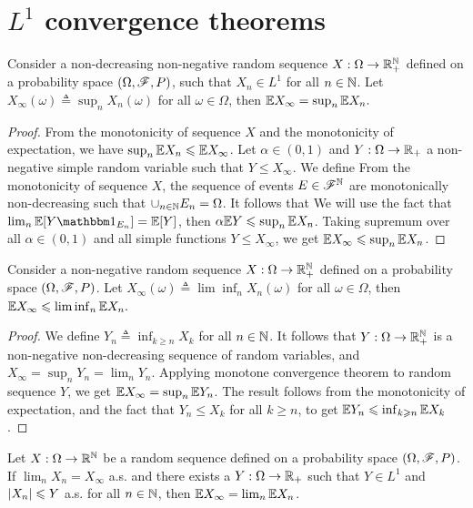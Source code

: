 \documentclass[letterpaper,10pt,english]{article}
\begin{document}
\section{$L^1$ convergence theorems}
\begin{thm}
Consider a non-decreasing non-negative random sequence $X: \Omega\to\mathbb{R}_+^{\mathbb{N}}$ defined on a probability space $(\Omega,\mathscr{F},P)$, 
such that $X_n \in L^1$ for all $n \in \mathbb{N}$. 
Let $X_\infty(\omega) \triangleq \sup_nX_n(\omega)$ for all $\omega \in \Omega$, then  
$
\mathbb{E} X_\infty = \sup_n\mathbb{E} X_n.
$
\end{thm}
\begin{proof}
From the monotonicity of sequence $X$ and the monotonicity of expectation, we have $\sup_n\mathbb{E} X_n \leqslant \mathbb{E} X_\infty$. 
Let $\alpha \in (0,1)$ and $Y: \Omega\to\mathbb{R}_+$ a non-negative simple random variable such that $Y \le X_\infty$. 
We define 
From the monotonicity of sequence $X$, 
the sequence of events $E \in \mathscr{F}^{\mathbb{N}}$ are monotonically non-decreasing such that $\cup_{n \in \mathbb{N}}E_n = \Omega$. 
It follows that 
We will use the fact that $\lim_n\E[Y\Ind{E_n}] = \E[Y]$, then $\alpha\mathbb{E} Y \leqslant \sup_n\mathbb{E} X_n$. 
Taking supremum over all $\alpha \in (0,1)$ and all simple functions $Y \le X_\infty$, we get $\mathbb{E} X_\infty \leqslant \sup_n\mathbb{E} X_n$. 
\end{proof}
\begin{thm}
Consider a non-negative random sequence $X: \Omega\to\mathbb{R}_+^{\mathbb{N}}$ defined on a probability space $(\Omega,\mathscr{F},P)$. 
Let $X_\infty(\omega) \triangleq \lim\inf_nX_n(\omega)$ for all $\omega\in\Omega$, then 
$
\mathbb{E} X_\infty \leqslant \lim\inf_n\mathbb{E} X_n.
$
\end{thm}
\begin{proof}
We define $Y_n \triangleq \inf_{k \ge n}X_k$ for all $n \in \mathbb{N}$. 
It follows that $Y: \Omega \to \mathbb{R}_+^{\mathbb{N}}$ is a non-negative non-decreasing sequence of random variables, 
and $X_\infty = \sup_nY_n = \lim_nY_n$. 
Applying monotone convergence theorem to random sequence $Y$, we get $\mathbb{E} X_\infty = \sup_n\mathbb{E} Y_n$. 
The result follows from the monotonicity of expectation, 
and the fact that $Y_n \le X_k$ for all $k \ge n$, to get $\mathbb{E} Y_n \leqslant \inf_{k\geqslant n}\mathbb{E} X_k$.  
\end{proof}
\begin{thm}
Let $X: \Omega \to \mathbb{R}^{\mathbb{N}}$ be a random sequence defined on a probability space $(\Omega, \mathscr{F}, P)$. %
If $\lim_nX_n = X_\infty$ a.s. and there exists a $Y: \Omega \to \mathbb{R}_+$ such that $Y \in L^1$ and $\left\lvert X_n\right\rvert \leqslant Y$ a.s. for all $n\in\mathbb{N}$, 
then $\mathbb{E} X_\infty = \lim_n\mathbb{E} X_n$. 
\end{thm}
\end{document}
